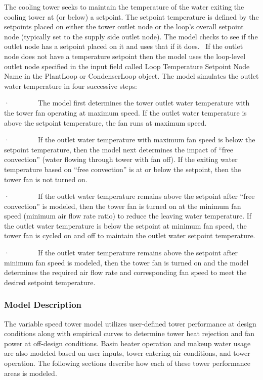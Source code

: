 The cooling tower seeks to maintain the temperature of the water exiting the cooling tower at (or below) a setpoint. The setpoint temperature is defined by the setpoints placed on either the tower outlet node or the loop's overall setpoint node (typically set to the supply side outlet node). The model checks to see if the outlet node has a setpoint placed on it and uses that if it does.~ If the outlet node does not have a temperature setpoint then the model uses the loop-level outlet node specified in the input field called Loop Temperature Setpoint Node Name in the PlantLoop or CondenserLoop object. The model simulates the outlet water temperature in four successive steps:

·~~~~~~~~The model first determines the tower outlet water temperature with the tower fan operating at maximum speed. If the outlet water temperature is above the setpoint temperature, the fan runs at maximum speed.

·~~~~~~~~If the outlet water temperature with maximum fan speed is below the setpoint temperature, then the model next determines the impact of ``free convection'' (water flowing through tower with fan off). If the exiting water temperature based on ``free convection'' is at or below the setpoint, then the tower fan is not turned on.

·~~~~~~~~If the outlet water temperature remains above the setpoint after ``free convection'' is modeled, then the tower fan is turned on at the minimum fan speed (minimum air flow rate ratio) to reduce the leaving water temperature. If the outlet water temperature is below the setpoint at minimum fan speed, the tower fan is cycled on and off to maintain the outlet water setpoint temperature.

·~~~~~~~~If the outlet water temperature remains above the setpoint after minimum fan speed is modeled, then the tower fan is turned on and the model determines the required air flow rate and corresponding fan speed to meet the desired setpoint temperature.

\subsubsection{Model Description}\label{model-description-1-005}

The variable speed tower model utilizes user-defined tower performance at design conditions along with empirical curves to determine tower heat rejection and fan power at off-design conditions. Basin heater operation and makeup water usage are also modeled based on user inputs, tower entering air conditions, and tower operation. The following sections describe how each of these tower performance areas is modeled.

